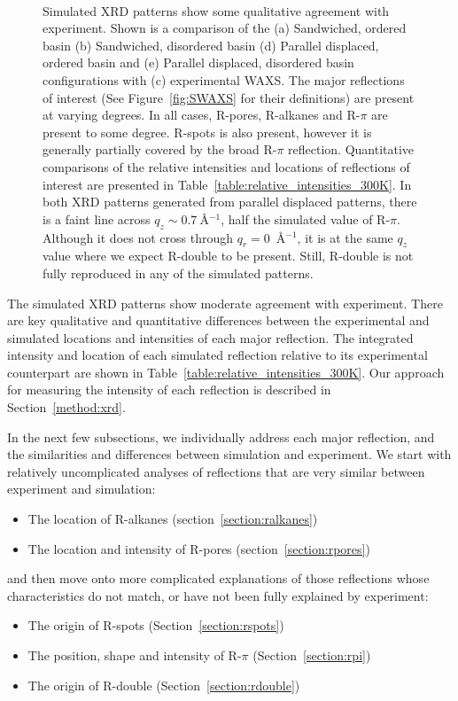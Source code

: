 \documentclass[journal=jpcbfk,manuscript=article]{achemso}
\begin{document}
\begin{figure}[!htb]
\begin{subfigure}{0.1\textwidth}
	\end{subfigure}	
	\caption{Simulated XRD patterns show some qualitative agreement with
		experiment. Shown is a comparison of the (a) Sandwiched, ordered basin (b)
		Sandwiched, disordered basin (d) Parallel displaced, ordered basin and (e)
		Parallel displaced, disordered basin configurations with (c) experimental WAXS.
		The major reflections of interest (See Figure~\ref{fig:SWAXS} for their
		definitions) are present at varying degrees. In all cases, R-pores, R-alkanes
		and R-$\pi$ are present to some degree. R-spots is also present, however it is
		generally partially covered by the broad R-$\pi$ reflection. Quantitative
		comparisons of the relative intensities and locations of reflections of
		interest are presented in Table~\ref{table:relative_intensities_300K}. In both
		XRD patterns generated from parallel displaced patterns, there is a faint line
		across $q_z \sim 0.7~$\AA$^{-1}$, half the simulated value of R-$\pi$. Although
		it does not cross through $q_r = 0$~\AA$^{-1}$, it is at the same $q_z$ value
		where we expect R-double to be present. Still, R-double is not fully reproduced
		in any of the simulated patterns.}~\label{fig:XRDsim} 
  \end{figure}
  
  The simulated XRD patterns show moderate agreement with experiment. There 
  are key qualitative and quantitative differences between the experimental and simulated
  locations and intensities of each major reflection. The integrated intensity and location
  of each simulated reflection relative to its experimental counterpart are shown in  
  Table~\ref{table:relative_intensities_300K}. Our approach for measuring the intensity of
  each reflection is described in Section~\ref{method:xrd}. 

  In the next few subsections, we individually address each major reflection, and the
  similarities and differences between simulation and experiment. We start with relatively 
  uncomplicated analyses of reflections that are very similar between experiment and simulation:
  \begin{itemize}
  	\item The location of R-alkanes (section~\ref{section:ralkanes})
  	\item The location and intensity of R-pores (section~\ref{section:rpores})
  \end{itemize}
  and then move onto more complicated explanations of those reflections whose characteristics
  do not match, or have not been fully explained by experiment:
  \begin{itemize}
  	\item The origin of R-spots (Section~\ref{section:rspots})
  	\item The position, shape and intensity of R-$\pi$ (Section~\ref{section:rpi})
  	\item The origin of R-double (Section~\ref{section:rdouble})
  \end{itemize}
  
\end{document}
